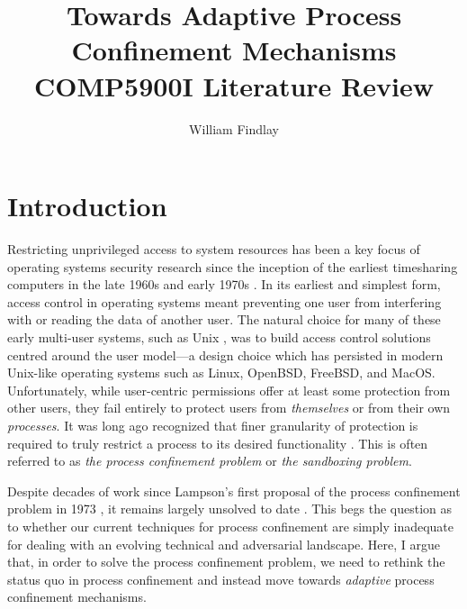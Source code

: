 \documentclass[dvipsnames, 12pt]{article}
\title{\huge Towards Adaptive Process Confinement
Mechanisms\\{\large COMP5900I Literature Review}}
\author{William Findlay}
\begin{document}
\maketitle
\thispagestyle{empty}


\vfill
\begin{abstract}
\end{abstract}
\vfill
\vfill

\clearpage

\setcounter{page}{1}

\onehalfspacing

\section{Introduction}
\label{sec:introduction}

Restricting unprivileged access to system resources has been a key focus of
operating systems security research since the inception of the earliest
timesharing computers in the late 1960s and early 1970s
\cite{graham1968_protection, ritchie1973_unix, corbato1962_ctss}. In its
earliest and simplest form, access control in operating systems meant preventing
one user from interfering with or reading the data of another user. The natural
choice for many of these early multi-user systems, such as Unix
\cite{ritchie1973_unix}, was to build access control solutions centred around
the user model---a design choice which has persisted in modern Unix-like
operating systems such as Linux, OpenBSD, FreeBSD, and MacOS.  Unfortunately,
while user-centric permissions offer at least some protection from other users,
they fail entirely to protect users from \textit{themselves} or from their own
\textit{processes}.  It was long ago recognized that finer granularity of
protection is required to truly restrict a process to its desired functionality
\cite{lampson1973_a_note}. This is often referred to as \textit{the process
confinement problem} or \textit{the sandboxing problem}.

Despite decades of work since Lampson's first proposal of the process
confinement problem in 1973 \cite{lampson1973_a_note}, it remains largely
unsolved to date \cite{crowell2013_confinement_problem}. This begs the question
as to whether our current techniques for process confinement are simply
inadequate for dealing with an evolving technical and adversarial landscape.
Here, I argue that, in order to solve the process confinement problem, we need
to rethink the status quo in process confinement and instead move towards
\textit{adaptive} process confinement mechanisms.
\end{document}
